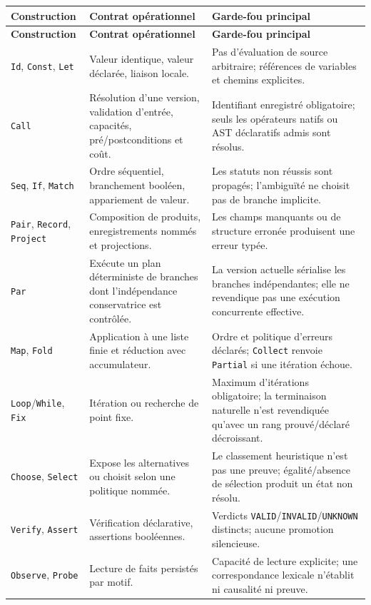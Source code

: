 \documentclass[11pt,a4paper,openany]{book}
\newcommand{\code}[1]{\texttt{#1}}
\theoremstyle{definition}
\theoremstyle{plain}
\theoremstyle{remark}
\begin{document}
\small
\begin{longtable}{p{}p{}p{}}
\toprule
\textbf{Construction} & \textbf{Contrat opérationnel} & \textbf{Garde-fou principal}\\
\midrule
\endfirsthead
\toprule \textbf{Construction} & \textbf{Contrat opérationnel} & \textbf{Garde-fou principal}\\ \midrule
\endhead
\code{Id}, \code{Const}, \code{Let} & Valeur identique, valeur déclarée, liaison locale. & Pas d'évaluation de source arbitraire; références de variables et chemins explicites.\\
\code{Call} & Résolution d'une version, validation d'entrée, capacités, pré/postconditions et coût. & Identifiant enregistré obligatoire; seuls les opérateurs natifs ou AST déclaratifs admis sont résolus.\\
\code{Seq}, \code{If}, \code{Match} & Ordre séquentiel, branchement booléen, appariement de valeur. & Les statuts non réussis sont propagés; l'ambiguïté ne choisit pas de branche implicite.\\
\code{Pair}, \code{Record}, \code{Project} & Composition de produits, enregistrements nommés et projections. & Les champs manquants ou de structure erronée produisent une erreur typée.\\
\code{Par} & Exécute un plan déterministe de branches dont l'indépendance conservatrice est contrôlée. & La version actuelle sérialise les branches indépendantes; elle ne revendique pas une exécution concurrente effective.\\
\code{Map}, \code{Fold} & Application à une liste finie et réduction avec accumulateur. & Ordre et politique d'erreurs déclarés; \code{Collect} renvoie \code{Partial} si une itération échoue.\\
\code{Loop}/\code{While}, \code{Fix} & Itération ou recherche de point fixe. & Maximum d'itérations obligatoire; la terminaison naturelle n'est revendiquée qu'avec un rang prouvé/déclaré décroissant.\\
\code{Choose}, \code{Select} & Expose les alternatives ou choisit selon une politique nommée. & Le classement heuristique n'est pas une preuve; égalité/absence de sélection produit un état non résolu.\\
\code{Verify}, \code{Assert} & Vérification déclarative, assertions booléennes. & Verdicts \code{VALID}/\code{INVALID}/\code{UNKNOWN} distincts; aucune promotion silencieuse.\\
\code{Observe}, \code{Probe} & Lecture de faits persistés par motif. & Capacité de lecture explicite; une correspondance lexicale n'établit ni causalité ni preuve.\\

\end{longtable}
\end{document}
